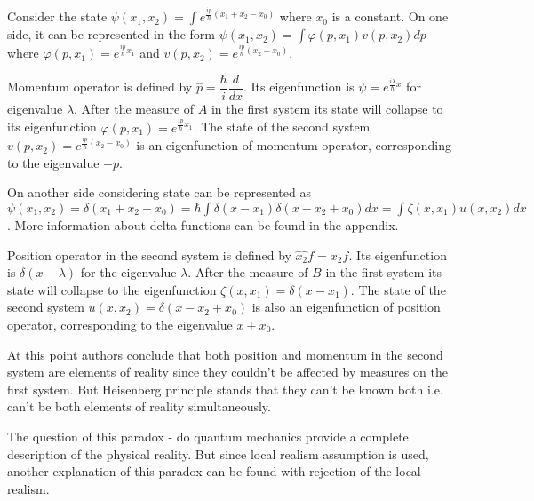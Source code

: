 \documentclass[11pt]{article}
\begin{document}
Consider the state $\psi(x_1, x_2) = \int e^{\frac{ip}{\hbar}(x_1+x_2-x_0)}$ where $x_0$ is a constant. On one side, it can be represented in the form $\psi(x_1, x_2) = \int\varphi(p, x_1)v(p, x_2)dp$ where $\varphi(p, x_1) = e^{\frac{ip}{\hbar}x_1}$ and $v(p, x_2) = e^{\frac{ip}{\hbar}(x_2-x_0)}$. 

Momentum operator is defined by $\hat{p} = \dfrac{\hbar}{i}\dfrac{d}{dx}$. Its eigenfunction is $\psi = e^{\frac{i\lambda}{\hbar}x}$ for eigenvalue $\lambda$. After the measure of $A$ in the first system its state will collapse to its eigenfunction $\varphi(p, x_1) = e^{\frac{ip}{\hbar}x_1}$. The state of the second system $v(p, x_2) = e^{\frac{ip}{\hbar}(x_2-x_0)}$ is an eigenfunction of momentum operator, corresponding to the eigenvalue $-p$. 

On another side considering state can be represented as $\psi(x_1, x_2) = \delta(x_1 + x_2 - x_0) = \hbar\int\delta(x - x_1)\delta (x - x_2 + x_0)dx = \int\zeta(x, x_1)u(x, x_2)dx$. More information about delta-functions can be found in the appendix.

Position operator in the second system is defined by $\hat{x_2}f = x_2f$. Its eigenfunction is $\delta(x - \lambda)$ for the eigenvalue $\lambda$. After the measure of $B$ in the first system its state will collapse to the eigenfunction $\zeta(x, x_1) = \delta(x - x_1)$. The state of the second system $u(x, x_2) = \delta(x - x_2 + x_0)$ is also an eigenfunction of position operator, corresponding to the eigenvalue $x + x_0$.

At this point authors conclude that both position and momentum in the second system are elements of reality since they couldn't be affected by measures on the first system. But Heisenberg principle stands that they can't be known both i.e. can't be both elements of reality simultaneously. 

The question of this paradox - do quantum mechanics provide a complete description of the physical reality. But since local realism assumption is used, another explanation of this paradox can be found with rejection of the local realism.



\end{document}
